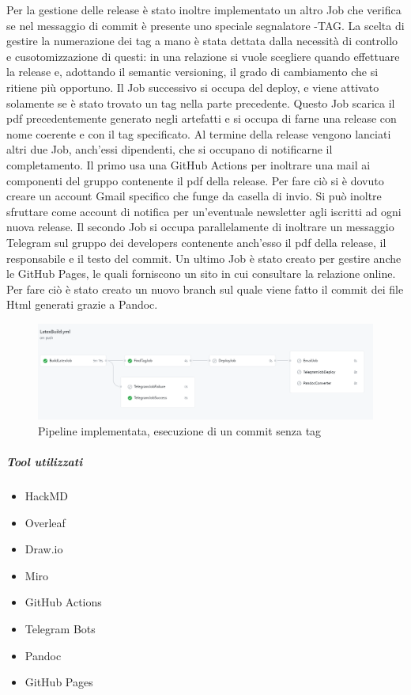         Per la gestione delle release è stato inoltre implementato un altro Job che verifica se nel messaggio di commit è presente uno speciale segnalatore -TAG{}. 
        La scelta di gestire la numerazione dei tag a mano è stata dettata dalla necessità di controllo e cusotomizzazione di questi: in una relazione si vuole scegliere quando effettuare la release e, adottando il semantic versioning, il grado di cambiamento che si ritiene più opportuno.
        Il Job successivo si occupa del deploy, e viene attivato solamente se è stato trovato un tag nella parte precedente. Questo Job scarica il pdf precedentemente generato negli artefatti e si occupa di farne una release con nome coerente e con il tag specificato. 
        Al termine della release vengono lanciati altri due Job, anch'essi dipendenti, che si occupano di notificarne il completamento. 
        Il primo usa una GitHub Actions per inoltrare una mail ai componenti del gruppo contenente il pdf della release. Per fare ciò si è dovuto creare un account Gmail specifico che funge da casella di invio. Si può inoltre sfruttare come account di notifica per un'eventuale newsletter agli iscritti ad ogni nuova release. 
        Il secondo Job si occupa parallelamente di inoltrare un messaggio Telegram sul gruppo dei developers contenente anch'esso il pdf della release, il responsabile e il testo del commit.
        Un ultimo Job è stato creato per gestire anche le GitHub Pages, le quali forniscono un sito in cui consultare la relazione online. Per fare ciò è stato   creato un nuovo branch sul quale viene fatto il commit dei file Html generati grazie a Pandoc.
        \begin{figure}[h]
            \caption{Pipeline implementata, esecuzione di un commit senza tag}
            \centering
            \includegraphics[width=1\textwidth]{Images/RepoCI.png}
        \end{figure}
        
        \subparagraph{Tool utilizzati}
        \begin{itemize}
            \item HackMD
            \item Overleaf
            \item Draw.io
            \item Miro
            \item GitHub Actions
            \item Telegram Bots
            \item Pandoc
            \item GitHub Pages
        \end{itemize}

